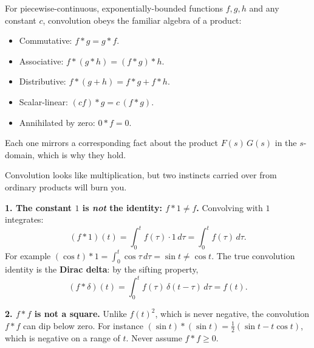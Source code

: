 \documentclass[11pt]{article}
\begin{document}
\begin{conceptbox}
For piecewise-continuous, exponentially-bounded functions $f, g, h$ and any constant $c$, convolution obeys the familiar algebra of a product:
\begin{itemize}[leftmargin=*, itemsep=1pt]
  \item \textcolor{accentorange}{Commutative:} $f * g = g * f$.
  \item \textcolor{accentorange}{Associative:} $f * (g * h) = (f * g) * h$.
  \item \textcolor{accentorange}{Distributive:} $f * (g + h) = f * g + f * h$.
  \item \textcolor{accentorange}{Scalar-linear:} $(c f) * g = c\,(f * g)$.
  \item \textcolor{accentorange}{Annihilated by zero:} $0 * f = 0$.
\end{itemize}
Each one mirrors a corresponding fact about the product $F(s)\,G(s)$ in the $s$-domain, which is why they hold.
\end{conceptbox}

\begin{warningbox}
Convolution looks like multiplication, but two instincts carried over from ordinary products will burn you.

\smallskip
\textbf{1. The constant $1$ is \emph{not} the identity: $f * 1 \ne f$.} Convolving with $1$ integrates:
\[ (f * 1)(t) = \int_0^t f(\tau)\cdot 1\, d\tau = \int_0^t f(\tau)\, d\tau. \]
For example $(\cos t) * 1 = \int_0^t \cos\tau\,d\tau = \sin t \ne \cos t$. The true convolution identity is the \textbf{Dirac delta}: by the sifting property,
\[ (f * \delta)(t) = \int_0^t f(\tau)\,\delta(t-\tau)\,d\tau = f(t). \]

\smallskip
\textbf{2. $f * f$ is not a square.} Unlike $f(t)^2$, which is never negative, the convolution $f * f$ can dip below zero. For instance $(\sin t)*(\sin t) = \tfrac{1}{2}(\sin t - t\cos t)$, which is negative on a range of $t$. Never assume $f * f \ge 0$.
\end{warningbox}
\end{document}
